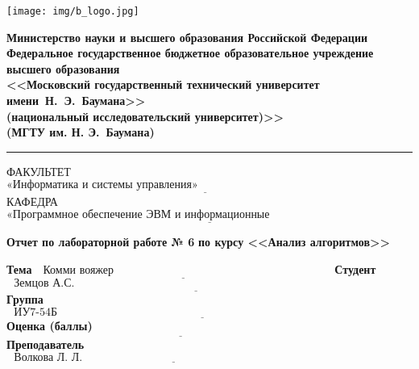 \begin{titlepage}
	\fontsize{12pt}{12pt}\selectfont
	\noindent \begin{minipage}{0.15\textwidth}
		\texttt{[image: img/b\_logo.jpg]}
	\end{minipage}
	\noindent\begin{minipage}{0.9\textwidth}\centering
		\textbf{Министерство науки и высшего образования Российской Федерации}\\
		\textbf{Федеральное государственное бюджетное образовательное учреждение высшего образования}\\
		\textbf{<<Московский государственный технический университет имени~Н.~Э.~Баумана>>}\\
		\textbf{(национальный исследовательский университет)>>}\\
		\textbf{(МГТУ им. Н. Э.~Баумана)}
	\end{minipage}
	
	\noindent\rule{18cm}{3pt}
	\newline\newline
	\noindent ФАКУЛЬТЕТ $\underline{\text{«Информатика и системы управления»~~~~~~~~~~~~~~~~~~~~~~~~~~~~~~~~~~~~~~~~~~~~~~~~~~~~~~~}}$ \newline\newline
	\noindent КАФЕДРА $\underline{\text{«Программное обеспечение ЭВМ и информационные технологии»~~~~~~~~~~~~~~~~~~~~~~~}}$\newline\newline\newline\newline\newline
	
	
	\begin{center}
		\Large\textbf{Отчет по лабораторной работе № 6}
		\Large\textbf{по курсу <<Анализ алгоритмов>>}
	\end{center}

	
	\noindent\textbf{Тема} $\underline{\text{~~Комми вояжер~~~~~~~~~~~~~~~~~~~~~~~~~~~~~~~~~~~~~~~~~~~~~~~~~~~~~~~~~~}}$\newline\newline
	\noindent\textbf{Студент} $\underline{\text{~~Земцов А.С.~~~~~~~~~~~~~~~~~~~~~~~~~~~~~~~~~~~~~~~~~~~~~~~~~~~~~~~~~~~~~~~~~~~~~~~~~~~~~~~~~~~}}$\newline\newline
	\noindent\textbf{Группа} $\underline{\text{~~ИУ7-54Б~~~~~~~~~~~~~~~~~~~~~~~~~~~~~~~~~~~~~~~~~~~~~~~~~~~~~~~~~~~~~~~~~~~~~~~~~~~~~~~~~~~~~~~~~~~}}$\newline\newline
	\noindent\textbf{Оценка (баллы)} $\underline{\text{~~~~~~~~~~~~~~~~~~~~~~~~~~~~~~~~~~~~~~~~~~~~~~~~~~~~~~~~~~~~~~~~~~~~~~~~~~~~~~~~~~~~~~~~~~~~~}}$\newline\newline
	\noindent\textbf{Преподаватель} $\underline{\text{~~Волкова Л. Л.~~~~~~~~~~~~~~~~~~~~~~~~~~~~~~~~~~~~~~~~~~~~~~~~~~~~~~~~~~~~~~~~~~~~~}}$\newline\newline\newline
	

\end{titlepage}
